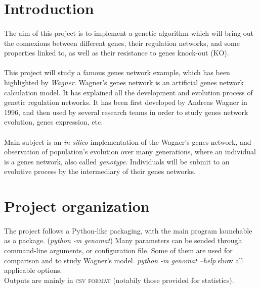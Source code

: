 \documentclass[]{report} %
\begin{document}
\section*{Introduction}
	\paragraph*{}
	The aim of this project is to implement a genetic algorithm which will bring out the connexions between different genes, 
        their regulation networks, and some properties linked to, as well as their resistance to genes knock-out (KO).
	\paragraph*{}
        This project will study a famous genes network example, which has been highlighted by \textit{Wagner}. Wagner's genes network is an artificial genes network calculation model. 
        It has explained all the development and evolution process of genetic regulation networks. It has been first developed by Andreas Wagner in 1996, 
        and then used by several research teams in order to study genes network evolution, genes expression, etc.
	\paragraph*{}
        Main subject is an \textit{in silico} implementation of the Wagner's genes network, and observation of population's evolution over many generations, where an individual is a  genes network, also called \textit{genotype}. 
        Individuals will be submit to an evolutive process by the intermediary of their genes networks.




\section*{Project organization}
	\paragraph*{}
        The project follows a Python-like packaging, with the main program launchable as a package. (\textit{python -m genomat})
        Many parameters can be sended through command-line arguments, or configuration file. Some of them are used for comparison and to study Wagner's model.
        \textit{python -m genomat --help} show all applicable options.\\
        Outputs are mainly in \textsc{csv format} (notabily those provided for statistics).
\end{document}
